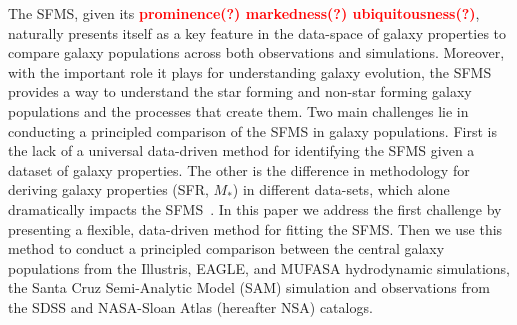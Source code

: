 \documentclass[preprint2,tighten]{aastex62}
\newcommand{\todo}[1]{{\bf \textcolor{red}{ #1}}}
\begin{document}
The SFMS, given its \todo{prominence(?) markedness(?) ubiquitousness(?)}, naturally presents itself as a key feature in the data-space of
galaxy properties to compare galaxy populations across both observations 
and simulations. Moreover, with the important role it plays for 
understanding galaxy evolution, the SFMS provides a way to understand the 
star forming and non-star forming galaxy populations and the processes 
that create them. Two main challenges lie in conducting a principled 
comparison of the SFMS in galaxy populations. First is the lack of a 
universal data-driven method for identifying the SFMS given a dataset 
of galaxy properties. The other is the difference in methodology for 
deriving galaxy properties (SFR, $M_*$) in different data-sets, which 
alone dramatically impacts the SFMS~\citep[\emph{e.g.}][]{speagle2014}. 
In this paper we address the first challenge by presenting a flexible, 
data-driven method for fitting the SFMS. Then we use this method to conduct
a principled comparison between the central galaxy populations from the Illustris,
EAGLE, and MUFASA hydrodynamic simulations, the Santa Cruz Semi-Analytic 
Model (SAM) simulation and observations from the SDSS and NASA-Sloan Atlas
(hereafter NSA) catalogs. 
\end{document}
